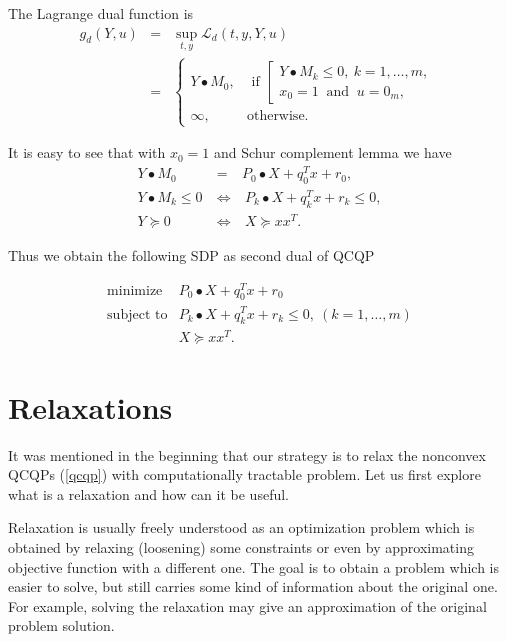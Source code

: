 \documentclass[12pt]{book}
\theoremstyle{definition}
\begin{document}
The Lagrange dual function is 
\begin{eqnarray}
g_d(Y,u) &=& \sup_{t,y} \mathcal{L}_d(t,y,Y,u) \\
&=&  \left\lbrace\begin{array}{ll}
Y\bullet M_0, & \mbox{ if } \left[\begin{array}{l} 
		 					 Y\bullet M_k \leq 0, \ k = 1,\dots ,m, \\
		 					 x_0 = 1 \ \mbox{ and } \
			 				 u = 0_m, 
			 				 \end{array}\right. \\
\infty, & \mbox{otherwise.} 
\end{array}\right. 
\end{eqnarray}

It is easy to see that with $x_0 = 1$ and Schur complement lemma we have
\begin{eqnarray}
Y\bullet M_0 &=& P_0\bullet X + q_0^Tx + r_0, \\
Y\bullet M_k \leq 0 \ &\Leftrightarrow& \ P_k\bullet X+ q_k^Tx + r_k \leq 0,\\
Y\succeq 0 \ &\Leftrightarrow& \ X\succeq xx^T.
\end{eqnarray}

Thus we obtain the following SDP as second dual of QCQP

\begin{equation}
\label{qcqpSecondDual} 
\begin{array}{ll}
\mbox{minimize}& P_0\bullet X + q_0^Tx + r_0\\
\mbox{subject to}& P_k\bullet X+ q_k^Tx + r_k \leq 0, \  (k = 1,\dots ,m)\\
& X\succeq xx^T.
\end{array} 
\end{equation}








\chapter{Relaxations}
\label{ChapterRelaxations}
It was mentioned in the beginning that our strategy is to relax the nonconvex QCQPs (\ref{qcqp}) with computationally tractable problem. Let us first explore what is a relaxation and how can it be useful. 

Relaxation is usually freely understood as an optimization problem which is obtained by relaxing (loosening) some constraints or even by approximating objective function with a different one. The goal is to obtain a problem which is easier to solve, but still carries some kind of information about the original one. For example, solving the relaxation may give an approximation of the original problem solution.
\end{document}
